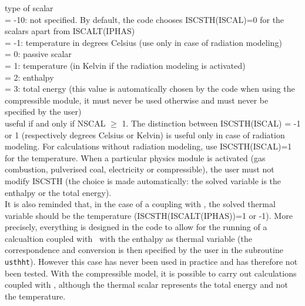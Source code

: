 {type of scalar\\
\hspace*{1.3cm}= -10: not specified. By default, the code chooses
ISCSTH(ISCAL)=0 for the scalars apart from ISCALT(IPHAS)\\
\hspace*{1.3cm}= -1: temperature in degrees Celsius (use only in case of
radiation modeling)\\
\hspace*{1.3cm}= 0: passive scalar\\
\hspace*{1.3cm}= 1: temperature (in Kelvin if the radiation modeling is
activated)\\
\hspace*{1.3cm}= 2: enthalpy\\
\hspace*{1.3cm}= 3: total energy (this value is automatically chosen by the code
when using the compressible module, it must never be used otherwise and must
never be specified by the user)\\
useful if and only if NSCAL $\geqslant$ 1. The distinction between
ISCSTH(ISCAL) = -1 or 1 (respectively degrees Celsius or Kelvin) is
useful only in case of radiation modeling. For calculations without
radiation modeling, use ISCSTH(ISCAL)=1 for the temperature. When a
particular physics module is activated (gas combustion, pulverised coal,
electricity or compressible), the user must not modify ISCSTH (the choice is made
automatically: the solved variable is the enthalpy or the total energy).\\
It is also reminded that, in the case of a coupling with
\syrthes, the solved thermal variable should be the temperature
(ISCSTH(ISCALT(IPHAS))=1 or -1).
More precisely, everything is designed in the code to allow for the 
running of a calcualtion coupled with \syrthes\ with the enthalpy as thermal
variable (the correspondence and conversion is then specified by the user in
the subroutine \texttt{usthht}).
However this case has never been used in practice and has therefore not been 
tested. With the compressible model, it is possible to carry out calculations
coupled with \syrthes, although the thermal scalar represents the total
energy and not the temperature.} 


